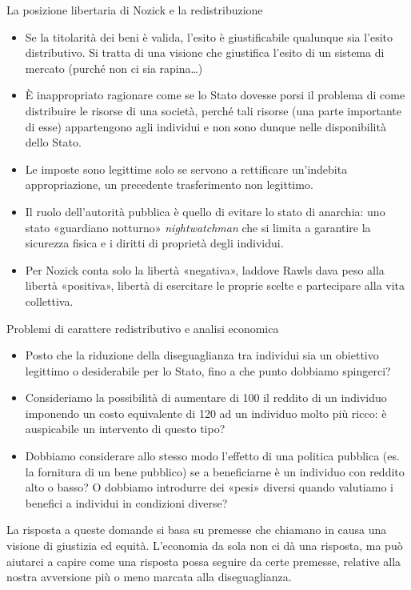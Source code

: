 \documentclass[aspectratio=64,12pt]{beamer}
\begin{document}
\begin{frame}{La posizione libertaria di Nozick e la redistribuzione}
\begin{itemize}
\item Se la titolarità dei beni è valida, l'esito è giustificabile qualunque sia
l'esito distributivo. Si tratta di una visione che giustifica l'esito di un
sistema di mercato (purché non ci sia rapina\ldots{})
\item È inappropriato ragionare come se lo Stato dovesse porsi il problema di come
distribuire le risorse di una società, perché tali risorse
(una parte importante di esse) appartengono agli individui e non sono dunque
nelle disponibilità dello Stato.
\item Le imposte sono legittime solo se servono a rettificare un'indebita
appropriazione, un precedente trasferimento non legittimo.
\item Il ruolo dell'autorità pubblica è quello di evitare lo stato di anarchia:
uno \alert{stato «guardiano notturno»} \emph{nightwatchman} che si limita a garantire la
sicurezza fisica e i diritti di proprietà degli individui.
\item Per Nozick conta solo la \alert{libertà «negativa»}, laddove Rawls dava peso alla
\alert{libertà «positiva»}, libertà di esercitare le proprie scelte e partecipare
alla vita collettiva.
\end{itemize}
\end{frame}

\begin{frame}{Problemi di carattere redistributivo e analisi economica}
\begin{itemize}
\item Posto che la riduzione della diseguaglianza tra individui sia un obiettivo legittimo o desiderabile per lo Stato, fino a che punto dobbiamo spingerci?
\item Consideriamo la possibilità di aumentare di 100 il reddito di un individuo
imponendo un costo equivalente di 120 ad un individuo molto più ricco: è
auspicabile un intervento di questo tipo?
\item Dobbiamo considerare allo stesso modo l'effetto di una politica pubblica
(es. la fornitura di un bene pubblico) se a beneficiarne è un individuo con
reddito alto o basso? O dobbiamo introdurre dei «pesi» diversi quando
valutiamo i benefici a individui in condizioni diverse?
\end{itemize}

\begin{block}{}
La risposta a queste domande si basa su premesse che chiamano in causa una visione di giustizia ed equità. L'economia da sola non ci dà una risposta, ma può aiutarci a capire come una risposta possa seguire da certe premesse, relative alla nostra avversione più o meno marcata alla
diseguaglianza.
\end{block}

\end{frame}
\end{document}

